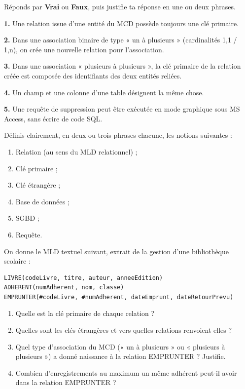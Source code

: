 \documentclass[11pt]{article}
\newcommand{\cle}[1]{{\popxbold\color{popdark}#1}}
\begin{document}
\begin{exercice}
Réponds par \textbf{Vrai} ou \textbf{Faux}, puis justifie ta réponse en une ou deux phrases.

\textbf{1.} Une relation issue d'une entité du MCD possède toujours une clé primaire.

\textbf{2.} Dans une association binaire de type « un à plusieurs » (cardinalités 1,1 / 1,n), on crée une nouvelle relation pour l'association.

\textbf{3.} Dans une association « plusieurs à plusieurs », la clé primaire de la relation créée est composée des identifiants des deux entités reliées.

\textbf{4.} Un champ et une colonne d'une table désignent la même chose.

\textbf{5.} Une requête de suppression peut être exécutée en mode graphique sous MS Access, sans écrire de code SQL.
\end{exercice}

\begin{exercice}[Définitions]
Définis clairement, en deux ou trois phrases chacune, les notions suivantes :
\begin{enumerate}
  \item \cle{Relation} (au sens du MLD relationnel) ;
  \item \cle{Clé primaire} ;
  \item \cle{Clé étrangère} ;
  \item \cle{Base de données} ;
  \item \cle{SGBD} ;
  \item \cle{Requête}.
\end{enumerate}
\end{exercice}

\begin{exercice}
On donne le MLD textuel suivant, extrait de la gestion d'une bibliothèque scolaire :

\begin{lstlisting}
LIVRE(codeLivre, titre, auteur, anneeEdition)
ADHERENT(numAdherent, nom, classe)
EMPRUNTER(#codeLivre, #numAdherent, dateEmprunt, dateRetourPrevu)
\end{lstlisting}

\begin{enumerate}
  \item Quelle est la clé primaire de chaque relation ?
  \item Quelles sont les clés étrangères et vers quelles relations renvoient-elles ?
  \item Quel type d'association du MCD (« un à plusieurs » ou « plusieurs à plusieurs ») a donné naissance à la relation EMPRUNTER ? Justifie.
  \item Combien d'enregistrements au maximum un même adhérent peut-il avoir dans la relation EMPRUNTER ?
\end{enumerate}
\end{exercice}
\end{document}
